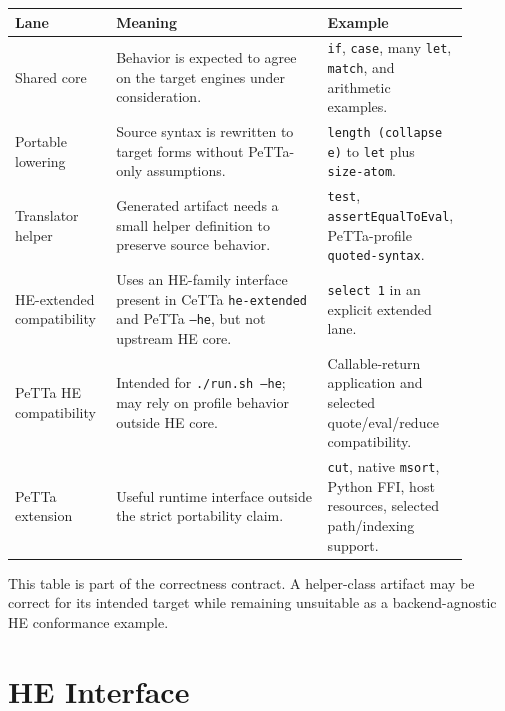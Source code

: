 \documentclass[11pt]{article}
\newcommand{\code}[1]{\texttt{#1}}
\newcommand{\HE}{\textup{HE}}
\newcommand{\PeTTa}{\textup{PeTTa}}
\begin{document}
\begin{longtable}{>{\raggedright\arraybackslash}p{0.22\linewidth}
                  >{\raggedright\arraybackslash}p{0.46\linewidth}
                  >{\raggedright\arraybackslash}p{0.22\linewidth}}
\toprule
Lane & Meaning & Example \\
\midrule
\endhead
Shared core & Behavior is expected to agree on the target engines under
consideration. & \code{if}, \code{case}, many \code{let}, \code{match}, and
arithmetic examples. \\
Portable lowering & Source syntax is rewritten to target forms without
\PeTTa{}-only assumptions. & \code{length (collapse e)} to \code{let} plus
\code{size-atom}. \\
Translator helper & Generated artifact needs a small helper definition to
preserve source behavior. & \code{test}, \code{assertEqualToEval},
\PeTTa{}-profile \code{quoted-syntax}. \\
\HE{}-extended compatibility & Uses an \HE{}-family interface present in CeTTa
\code{he-extended} and \PeTTa{} \code{--he}, but not upstream \HE{} core. &
\code{select 1} in an explicit extended lane. \\
\PeTTa{} \HE{} compatibility & Intended for \code{./run.sh --he}; may rely on
profile behavior outside \HE{} core. & Callable-return application and selected
quote/eval/reduce compatibility. \\
\PeTTa{} extension & Useful runtime interface outside the strict portability
claim. & \code{cut}, native \code{msort}, Python FFI, host resources, selected path/indexing support. \\
\bottomrule
\end{longtable}

This table is part of the correctness contract.  A helper-class artifact may be
correct for its intended target while remaining unsuitable as a backend-agnostic
\HE{} conformance example.

\section{\HE{} Interface}
\end{document}
